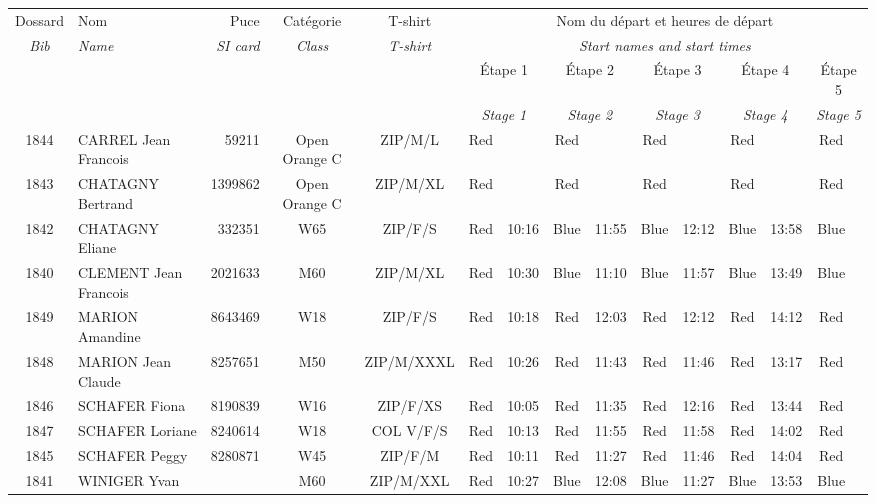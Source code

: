 \documentclass{report}
\begin{document}
  \begin{longtable}{|c|l|r|c|c|*{5}{cc|}}
    Dossard & Nom  & Puce    & Catégorie & T-shirt & \multicolumn{10}{c|}{Nom du départ et heures de départ} \\
    \itshape Bib     & \itshape Name & \itshape SI card & \itshape Class  & \itshape  T-shirt  & \multicolumn{10}{c|}{\itshape Start names and start times} \\
    \hline
    & & & & & \multicolumn{2}{c|}{Étape 1} & \multicolumn{2}{c|}{Étape 2} & \multicolumn{2}{c|}{Étape 3} & \multicolumn{2}{c|}{Étape 4} & \multicolumn{2}{c|}{Étape 5} \\
    & & & & & \multicolumn{2}{c|}{\itshape Stage 1} & \multicolumn{2}{c|}{\itshape Stage 2} & \multicolumn{2}{c|}{\itshape Stage 3} & \multicolumn{2}{c|}{\itshape Stage 4} & \multicolumn{2}{c|}{\itshape Stage 5} \\
    \hline
    1844 & CARREL Jean Francois & 59211 & Open Orange C & ZIP/M/L & Red &   & Red &   & Red &   & Red &   & Red &  \\
    1843 & CHATAGNY Bertrand & 1399862 & Open Orange C & ZIP/M/XL & Red &   & Red &   & Red &   & Red &   & Red &  \\
    1842 & CHATAGNY Eliane & 332351 & W65 & ZIP/F/S & Red & 10:16 & Blue & 11:55 & Blue & 12:12 & Blue & 13:58 & Blue &  \\
    1840 & CLEMENT Jean Francois & 2021633 & M60 & ZIP/M/XL & Red & 10:30 & Blue & 11:10 & Blue & 11:57 & Blue & 13:49 & Blue &  \\
    1849 & MARION Amandine & 8643469 & W18 & ZIP/F/S & Red & 10:18 & Red & 12:03 & Red & 12:12 & Red & 14:12 & Red &  \\
    1848 & MARION Jean Claude & 8257651 & M50 & ZIP/M/XXXL & Red & 10:26 & Red & 11:43 & Red & 11:46 & Red & 13:17 & Red &  \\
    1846 & SCHAFER Fiona & 8190839 & W16 & ZIP/F/XS & Red & 10:05 & Red & 11:35 & Red & 12:16 & Red & 13:44 & Red &  \\
    1847 & SCHAFER Loriane & 8240614 & W18 & COL V/F/S & Red & 10:13 & Red & 11:55 & Red & 11:58 & Red & 14:02 & Red &  \\
    1845 & SCHAFER Peggy & 8280871 & W45 & ZIP/F/M & Red & 10:11 & Red & 11:27 & Red & 11:46 & Red & 14:04 & Red &  \\
    1841 & WINIGER Yvan &  & M60 & ZIP/M/XXL & Red & 10:27 & Blue & 12:08 & Blue & 11:27 & Blue & 13:53 & Blue &  \\
  \end{longtable}
\newpage
\end{document}
